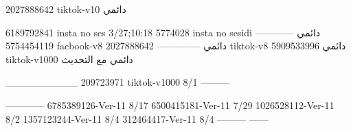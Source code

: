 2027888642 tiktok-v10
دائمي

6189792841 insta no ses
3/27;10:18
5774028 insta no sesidi
دائمي
------------
5754454119 facbook-v8
دائمي
--------------
2027888642 tiktok-v8
دائمي
5909533996 tiktok-v1000
دائمي مع التحديث

__________
209723971 tiktok-v1000
8/1
---------

------------
6785389126-Ver-11
8/17
6500415181-Ver-11
7/29
1026528112-Ver-11
8/2
1357123244-Ver-11
8/4
312464417-Ver-11
8/4
---------
------
